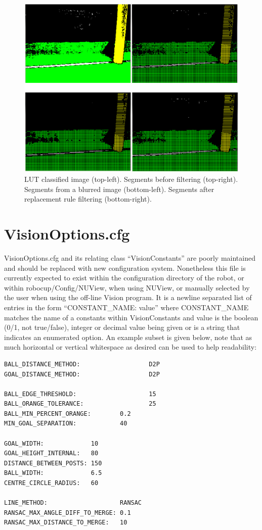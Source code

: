 \documentclass[]{report}
\begin{document}
\begin{figure}[!htbp]
\centering
\vspace{2mm}
\includegraphics[scale=0.45,angle=0]{rep_rules_vs_gaussian.eps}
\caption{\footnotesize LUT classified image (top-left). Segments before filtering (top-right). Segments from a blurred image (bottom-left). Segments after replacement rule filtering (bottom-right). \normalsize}
\label{fig:rep_rules_vs_gaussian}
\end{figure}
\FloatBarrier

\section{VisionOptions.cfg}
VisionOptions.cfg and its relating class ``VisionConstants'' are poorly maintained and should be replaced with new configuration system. Nonetheless this file is currently expected to exist within the configuration directory of the robot, or within robocup/Config/NUView, when using NUView, or manually selected by the user when using the off-line Vision program. It is a newline separated list of entries in the form ``CONSTANT\_NAME: value'' where CONSTANT\_NAME matches the name of a constants within VisionConstants and value is the boolean (0/1, not true/false), integer or decimal value being given or is a string that indicates an enumerated option. An example subset is given below, note that as much horizontal or vertical whitespace as desired can be used to help readability:

\begin{verbatim}
BALL_DISTANCE_METHOD:                   D2P
GOAL_DISTANCE_METHOD:                   D2P

BALL_EDGE_THRESHOLD:                    15
BALL_ORANGE_TOLERANCE:                  25
BALL_MIN_PERCENT_ORANGE:		0.2
MIN_GOAL_SEPARATION:            40

GOAL_WIDTH:             10
GOAL_HEIGHT_INTERNAL:   80
DISTANCE_BETWEEN_POSTS: 150
BALL_WIDTH:             6.5
CENTRE_CIRCLE_RADIUS:   60

LINE_METHOD:	                RANSAC
RANSAC_MAX_ANGLE_DIFF_TO_MERGE: 0.1
RANSAC_MAX_DISTANCE_TO_MERGE:   10
\end{verbatim}
\end{document}

